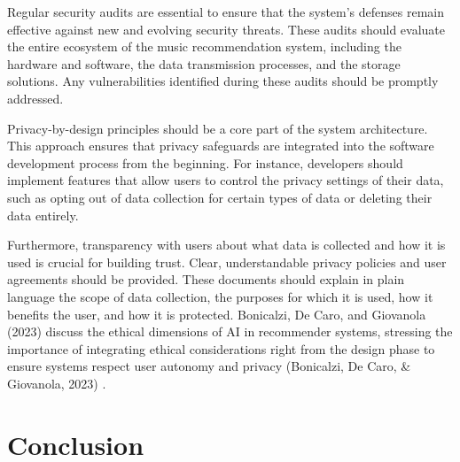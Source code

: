 \documentclass[10pt,twocolumn]{article}
\begin{document}
Regular security audits are essential to ensure that the system’s defenses remain effective against new and evolving security threats. These audits should evaluate the entire ecosystem of the music recommendation system, including the hardware and software, the data transmission processes, and the storage solutions. Any vulnerabilities identified during these audits should be promptly addressed.

Privacy-by-design principles should be a core part of the system architecture. This approach ensures that privacy safeguards are integrated into the software development process from the beginning. For instance, developers should implement features that allow users to control the privacy settings of their data, such as opting out of data collection for certain types of data or deleting their data entirely.

Furthermore, transparency with users about what data is collected and how it is used is crucial for building trust. Clear, understandable privacy policies and user agreements should be provided. These documents should explain in plain language the scope of data collection, the purposes for which it is used, how it benefits the user, and how it is protected. Bonicalzi, De Caro, and Giovanola (2023) \cite{bonicalzi2023artificial} discuss the ethical dimensions of AI in recommender systems, stressing the importance of integrating ethical considerations right from the design phase to ensure systems respect user autonomy and privacy (Bonicalzi, De Caro, & Giovanola, 2023) \cite{bonicalzi2023artificial}.



\section{Conclusion}
\end{document}
